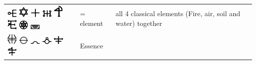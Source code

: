 \documentclass[british,final,landscape]{scrartcl}
\begin{document}
\begin{refsection}
\begin{supertabular}{p{0.3\textwidth}p{0.34\textwidth}p{0.34\textwidth}}
  \includegraphics[width=5mm]{Concepts/Element} \includegraphics[width=5mm]{Concepts/Element2} \includegraphics[width=5mm]{Concepts/Element3} \includegraphics[width=5mm]{Concepts/Element4} \includegraphics[width=5mm]{Concepts/Element5} \includegraphics[width=5mm]{Concepts/Element6} \includegraphics[width=5mm]{Concepts/Element7} \includegraphics[width=5mm]{Concepts/Element8} &  = element & all 4 classical elements (Fire, air, soil and water) together\\
  \includegraphics[width=5mm]{Concepts/Essence} \includegraphics[width=5mm]{Concepts/Essence2} \includegraphics[width=5mm]{Concepts/Essence3} \includegraphics[width=5mm]{Concepts/Essence4} \includegraphics[width=5mm]{Concepts/Essence5} \includegraphics[width=5mm]{Concepts/Essence6} & Essence & \\

\end{supertabular}
\end{refsection}
\end{document}
